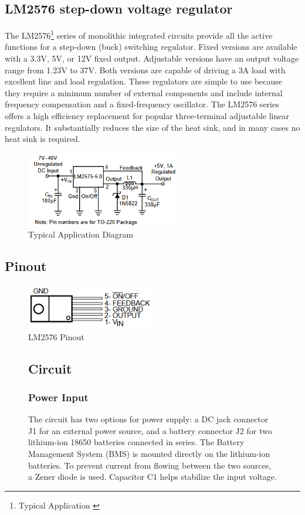 \subsection{LM2576 step-down voltage regulator}
The LM2576\footnote{Typical Application \cite{application}} series of monolithic integrated circuits provide
all the active functions for a step-down (buck) switching
regulator. Fixed versions are available with a 3.3V, 5V, or 12V
fixed output. Adjustable versions have an output voltage
range from 1.23V to 37V. Both versions are capable of driving
a 3A load with excellent line and load regulation.
These regulators are simple to use because they require a
minimum number of external components and include internal
frequency compensation and a fixed-frequency oscillator.
The LM2576 series offers a high efficiency replacement for
popular three-terminal adjustable linear regulators. It
substantially reduces the size of the heat sink, and in many
cases no heat sink is required.

\begin{figure}[H]
  \centering
  \includegraphics[width=0.6\textwidth]{assets/LM2576 Application.png}
  \caption{Typical Application Diagram}
\end{figure}

\subsection{Pinout}
\begin{figure}[H]
  \centering
  \includegraphics[width=0.5\textwidth]{assets/Pinout.png}
  \caption{LM2576 Pinout}
\end{figure}

\begin{figure}[H]   
\subsection{Circuit}
\subsubsection{Power Input}
The circuit has two options for power supply: a DC jack connector J1 for an external power source, and a battery connector J2 for two lithium-ion 18650 batteries connected in series. The Battery Management System (BMS) is mounted directly on the lithium-ion batteries. To prevent current from flowing between the two sources, a Zener diode is used. Capacitor C1 helps stabilize the input voltage.
\end{figure}

